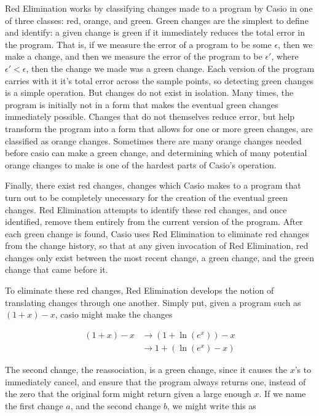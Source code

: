 \documentclass{article}
\newcommand{\lnexp}[1]{\ln{\left(e^{#1}\right)}}
\begin{document}
Red Elimination works by classifying changes made to a program by Casio in one of three classes: 
red, orange, and green. 
Green changes are the simplest to define and identify: 
a given change is green if it immediately reduces the total error in the program. 
That is, if we measure the error of a program to be some $\epsilon$, 
then we make a change, 
and then we measure the error of the program to be $\epsilon'$, 
where $\epsilon' < \epsilon$, 
then the change we made was a green change. 
Each version of the program carries with it 
it's total error across the sample points, 
so detecting green changes is a simple operation. 
But changes do not exist in isolation. 
Many times, the program is initially not in a form 
that makes the eventual green changes immediately possible. 
Changes that do not themselves reduce error, 
but help transform the program into a form 
that allows for one or more green changes, 
are classified as orange changes. 
Sometimes there are many orange changes needed 
before casio can make a green change, 
and determining which of many potential orange changes 
to make is one of the hardest parts of Casio's operation.

Finally, there exist red changes, 
changes which Casio makes to a program 
that turn out to be completely unecessary 
for the creation of the eventual green changes. 
Red Elimination attempts to identify these red changes, 
and once identified, 
remove them entirely from the current version of the program. 
After each green change is found, 
Casio uses Red Elimination to eliminate red changes from the change history, 
so that at any given invocation of Red Elimination, 
red changes only exist between the most recent change, 
a green change,
and the green change that came before it.

To eliminate these red changes, 
Red Elimination develops the notion of translating changes through one another. 
Simply put, 
given a program such as $(1 + x) - x$, 
casio might make the changes

\begin{align*}
(1 + x) - x
&\to (1 + \lnexp{x}) - x\\
&\to 1 + (\lnexp{x} - x)
\end{align*}

The second change, 
the reassociation, is a green change, 
since it causes the $x$'s to immediately cancel, 
and ensure that the program always returns one, 
instead of the zero that the original form might return 
given a large enough $x$. 
If we name the first change $a$, 
and the second change $b$, 
we might write this as 
\end{document}
